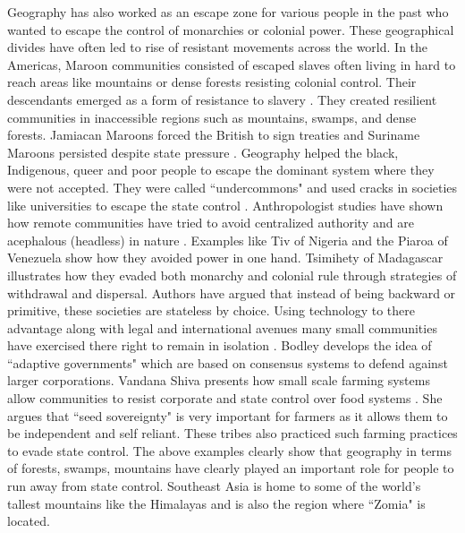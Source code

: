 Geography has also worked as an escape zone for various people in the past who wanted to escape the control of monarchies or colonial power. These geographical divides have often led to rise of resistant movements across the world. In the Americas, Maroon communities consisted of escaped slaves often living in hard to reach areas like mountains or dense forests resisting colonial control. Their descendants emerged as a form of resistance to slavery \citep{price2020rainforest}. They created resilient communities in inaccessible regions such as mountains, swamps, and dense forests. Jamiacan Maroons forced the British to sign treaties and Suriname Maroons persisted despite state pressure \citep{Cultural_Survival_Bilby}. Geography helped the  black, Indigenous, queer and poor people to escape the dominant system where they were not accepted. They were called ``undercommons" and used cracks in societies like universities to escape the state control \citep{harney2013undercommons}. Anthropologist studies have shown how remote communities have tried to avoid centralized authority and are acephalous (headless) in nature \citep{graeber2004fragments}. Examples like Tiv of Nigeria and the Piaroa of Venezuela show how they avoided power in one hand. Tsimihety of Madagascar illustrates how they evaded both monarchy and colonial rule through strategies of withdrawal and dispersal. Authors have argued that instead of being backward or primitive, these societies are stateless by choice. Using technology to there advantage along with legal and international avenues many small communities have exercised there right to remain in isolation \citep{bodley2012anthropology,bodley2014victims}. Bodley develops the idea of ``adaptive governments" which are based on consensus systems to defend against larger corporations. Vandana Shiva presents how small scale farming systems allow communities to resist corporate and state control over food systems \citep{hrynkow2018}. She argues that ``seed sovereignty" is very important for farmers as it allows them to be independent and self reliant. These tribes also practiced such farming practices to evade state control. The above examples clearly show that geography in terms of forests, swamps, mountains have clearly played an important role for people to run away from state control. Southeast Asia is home to some of the world's tallest mountains like the Himalayas and is also the region where ``Zomia" is located.

